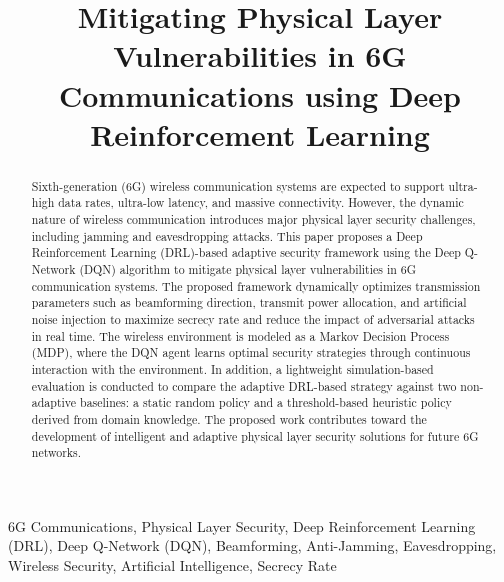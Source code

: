 \documentclass[conference]{IEEEtran}
\begin{document}
\title{Mitigating Physical Layer Vulnerabilities in 6G Communications using Deep Reinforcement Learning}

\author{
\and
{}
\and
{}
}


\maketitle

\begin{abstract}
Sixth-generation (6G) wireless communication systems are expected to support ultra-high data rates, ultra-low latency, and massive connectivity. However, the dynamic nature of wireless communication introduces major physical layer security challenges, including jamming and eavesdropping attacks.
This paper proposes a Deep Reinforcement Learning (DRL)-based adaptive security framework using the Deep Q-Network (DQN) algorithm to mitigate physical layer vulnerabilities in 6G communication systems. The proposed framework dynamically optimizes transmission parameters such as beamforming direction, transmit power allocation, and artificial noise injection to maximize secrecy rate and reduce the impact of adversarial attacks in real time.
The wireless environment is modeled as a Markov Decision Process (MDP), where the DQN agent learns optimal security strategies through continuous interaction with the environment. In addition, a lightweight simulation-based evaluation is conducted to compare the adaptive DRL-based strategy against two non-adaptive baselines: a static random policy and a threshold-based heuristic policy derived from domain knowledge. The proposed work contributes toward the development of intelligent and adaptive physical layer security solutions for future 6G networks.
\end{abstract}
\begin{IEEEkeywords}
6G Communications, Physical Layer Security, Deep Reinforcement Learning (DRL), Deep Q-Network (DQN), Beamforming, Anti-Jamming, Eavesdropping, Wireless Security, Artificial Intelligence, Secrecy Rate
\end{IEEEkeywords}
\end{document}
